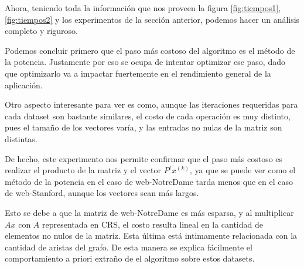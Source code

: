Ahora, teniendo toda la información que nos proveen la figura \ref{fig:tiempos1}, \ref{fig:tiempos2} y los experimentos de la sección anterior, podemos hacer un análisis completo y riguroso.

Podemos concluir primero que el paso más costoso del algoritmo es el método de la potencia. Justamente por eso \cite{Kamvar2003} se ocupa de intentar optimizar ese paso, dado que optimizarlo va a impactar fuertemente en el rendimiento general de la aplicación.


Otro aspecto interesante para ver es como, aunque las iteraciones requeridas para cada dataset son bastante similares, el costo de cada operación es muy distinto, pues el tamaño de los vectores varía, y las entradas no nulas de la matriz son distintas. 

De hecho, este experimento nos permite confirmar que el paso más costoso es realizar el producto de la matriz y el vector $P^t x^{(k)}$, ya que se puede ver como el método de la potencia en el caso de web-NotreDame tarda menos que en el caso de web-Stanford, aunque los vectores sean más largos. 

Esto se debe a que la matriz de web-NotreDame es más esparsa, y al multiplicar $Ax$ con $A$ representada en CRS, el costo resulta lineal en la cantidad de elementos no nulos de la matriz. Esta última está intimamente relacionada con la cantidad de aristas del grafo. De esta manera se explica fácilmente el comportamiento a priori extraño de el algoritmo sobre estos datasets.

